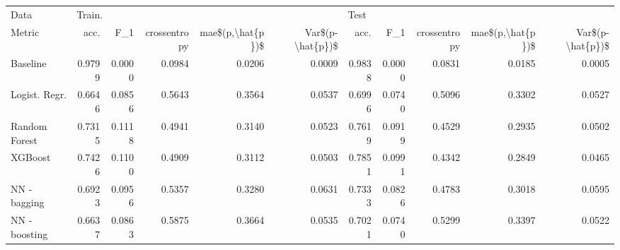 \begin{tabular}{lrrrrrrrrrr}
\toprule
Data & \multicolumn{5}{l}{Train.} & \multicolumn{5}{l}{Test} \\
Metric &    acc. &     F\_1 & crossentropy & mae\$(p,\textbackslash hat\{p\})\$ & Var\$(p-\textbackslash hat\{p\})\$ &    acc. &     F\_1 & crossentropy & mae\$(p,\textbackslash hat\{p\})\$ & Var\$(p-\textbackslash hat\{p\})\$ \\
\midrule
Baseline      &  0.9799 &  0.0000 &       0.0984 &           0.0206 &           0.0009 &  0.9838 &  0.0000 &       0.0831 &           0.0185 &           0.0005 \\
Logist. Regr. &  0.6646 &  0.0856 &       0.5643 &           0.3564 &           0.0537 &  0.6996 &  0.0740 &       0.5096 &           0.3302 &           0.0527 \\
Random Forest &  0.7315 &  0.1118 &       0.4941 &           0.3140 &           0.0523 &  0.7619 &  0.0919 &       0.4529 &           0.2935 &           0.0502 \\
XGBoost       &  0.7426 &  0.1100 &       0.4909 &           0.3112 &           0.0503 &  0.7851 &  0.0991 &       0.4342 &           0.2849 &           0.0465 \\
NN - bagging  &  0.6923 &  0.0956 &       0.5357 &           0.3280 &           0.0631 &  0.7333 &  0.0826 &       0.4783 &           0.3018 &           0.0595 \\
NN - boosting &  0.6637 &  0.0863 &       0.5875 &           0.3664 &           0.0535 &  0.7021 &  0.0740 &       0.5299 &           0.3397 &           0.0522 \\
\bottomrule
\end{tabular}
